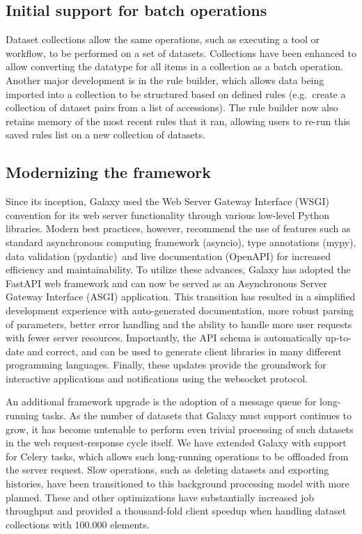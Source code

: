 \subsection*{Initial support for batch operations}
Dataset collections allow the same operations, such as executing a tool or workflow, to be performed on a set of datasets. Collections have been enhanced to allow converting the datatype for all items in a collection as a batch operation. Another major development is in the rule builder, which allows data being imported into a collection to be structured based on defined rules (e.g. create a collection of dataset pairs from a list of accessions). The rule builder now also retains memory of the most recent rules that it ran, allowing users to re-run this saved rules list on a new collection of datasets.

\subsection*{Modernizing the framework}
Since its inception, Galaxy used the Web Server Gateway Interface (WSGI) convention for its web server functionality through various low-level Python libraries. Modern best practices, however, recommend the use of features such as standard asynchronous computing framework (asyncio), type annotations (mypy), data validation (pydantic) and live documentation (OpenAPI) for increased efficiency and maintainability. To utilize these advances, Galaxy has adopted the FastAPI web framework and can now be served as an Asynchronous Server Gateway Interface (ASGI) application. This transition has resulted in a simplified development experience with auto-generated documentation, more robust parsing of parameters, better error handling and the ability to handle more user requests with fewer server resources. Importantly, the API schema is automatically up-to-date and correct, and can be used to generate client libraries in many different programming languages. Finally, these updates provide the groundwork for interactive applications and notifications using the websocket protocol.

An additional framework upgrade is the adoption of a message queue for long-running tasks. As the number of datasets that Galaxy must support continues to grow, it has become untenable to perform even trivial processing of such datasets in the web request-response cycle itself. We have extended Galaxy with support for Celery tasks, which allows such long-running operations to be offloaded from the server request. Slow operations, such as deleting datasets and exporting histories, have been transitioned to this background processing model with more planned. These and other optimizations have substantially increased job throughput and provided a thousand-fold client speedup when handling dataset collections with 100.000 elements.

